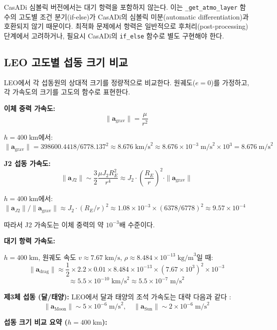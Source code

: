 \documentclass[11pt]{article}
\begin{document}
CasADi 심볼릭 버전에서는 대기 항력을 포함하지 않는다. 이는 \texttt{\_get\_atmo\_layer} 함수의 고도별 조건 분기(if-else)가 CasADi의 심볼릭 미분(automatic differentiation)과 호환되지 않기 때문이다. 최적화 문제에서 항력은 일반적으로 후처리(post-processing) 단계에서 고려하거나, 필요시 CasADi의 \texttt{if\_else} 함수로 별도 구현해야 한다.


\subsection{LEO 고도별 섭동 크기 비교}

LEO에서 각 섭동원의 상대적 크기를 정량적으로 비교한다. 원궤도($e = 0$)를 가정하고, 각 가속도의 크기를 고도의 함수로 표현한다.

\textbf{이체 중력 가속도:}
\[
\|\mathbf{a}_{\text{grav}}\| = \frac{\mu}{r^2}
\]

$h = 400\;\text{km}$에서: $\|\mathbf{a}_{\text{grav}}\| = 398600.4418 / 6778.137^2 \approx 8.676\;\text{km/s}^2 \approx 8.676 \times 10^{-3}\;\text{m/s}^2 \times 10^3 = 8.676\;\text{m/s}^2$

\textbf{J2 섭동 가속도:}
\[
\|\mathbf{a}_{J2}\| \sim \frac{3}{2}\frac{\mu J_2 R_E^2}{r^4} \approx J_2 \cdot \left(\frac{R_E}{r}\right)^2 \cdot \|\mathbf{a}_{\text{grav}}\|
\]

$h = 400\;\text{km}$에서: $\|\mathbf{a}_{J2}\| / \|\mathbf{a}_{\text{grav}}\| \approx J_2 \cdot (R_E/r)^2 \approx 1.08 \times 10^{-3} \times (6378/6778)^2 \approx 9.57 \times 10^{-4}$

따라서 J2 가속도는 이체 중력의 약 $10^{-3}$배 수준이다.

\textbf{대기 항력 가속도:}

$h = 400\;\text{km}$, 원궤도 속도 $v \approx 7.67\;\text{km/s}$, $\rho \approx 8.484 \times 10^{-13}\;\text{kg/m}^3$일 때:
\[
\|\mathbf{a}_{\text{drag}}\| \approx \frac{1}{2} \times 2.2 \times 0.01 \times 8.484 \times 10^{-13} \times (7.67 \times 10^3)^2 \times 10^{-3}
\]
\[
\approx 5.5 \times 10^{-10}\;\text{km/s}^2 \approx 5.5 \times 10^{-7}\;\text{m/s}^2
\]

\textbf{제3체 섭동 (달/태양):} LEO에서 달과 태양의 조석 가속도는 대략 다음과 같다 \cite{Montenbruck2000}:
\[
\|\mathbf{a}_{\text{Moon}}\| \sim 5 \times 10^{-6}\;\text{m/s}^2, \quad \|\mathbf{a}_{\text{Sun}}\| \sim 2 \times 10^{-6}\;\text{m/s}^2
\]

\textbf{섭동 크기 비교 요약 ($h = 400\;\text{km}$):}
\end{document}
